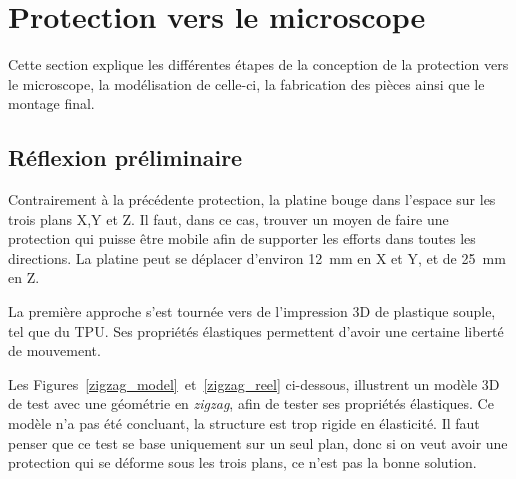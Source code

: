 \section{Protection vers le microscope}
Cette section explique les différentes étapes de la conception de la protection vers le microscope, la modélisation de celle-ci, la fabrication des pièces ainsi que le montage final.
\subsection{Réflexion préliminaire}
Contrairement à la précédente protection, la platine bouge dans l'espace sur les trois plans X,Y et Z. Il faut, dans ce cas, trouver un moyen de faire une protection qui puisse être mobile afin de supporter les efforts dans toutes les directions. La platine peut se déplacer d'environ 12~mm en X et Y, et de 25~mm en Z.

La première approche s'est tournée vers de l'impression 3D de plastique souple, tel que du TPU. Ses propriétés élastiques permettent d'avoir une certaine liberté de mouvement.

Les Figures~\ref{zigzag_model}~et~\ref{zigzag_reel} ci-dessous, illustrent un modèle 3D de test avec une géométrie en \textit{zigzag}, afin de tester ses propriétés élastiques. Ce modèle n'a pas été concluant, la structure est trop rigide en élasticité. Il faut penser que ce test se base uniquement sur un seul plan, donc si on veut avoir une protection qui se déforme sous les trois plans, ce n'est pas la bonne solution.

